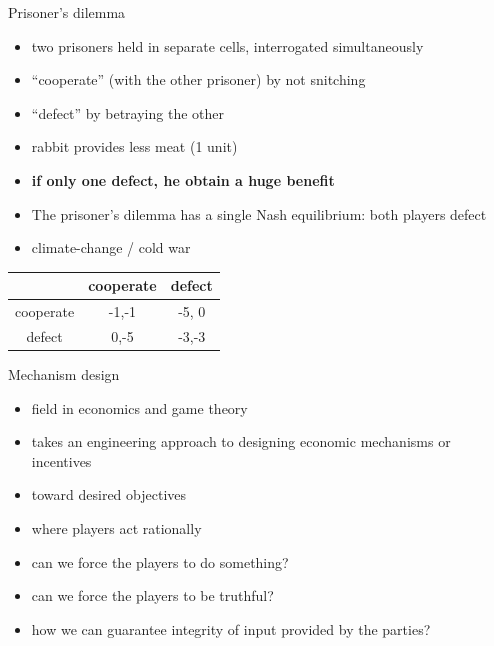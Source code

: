 \documentclass{beamer}
\begin{document}
\begin{frame}[t]{Prisoner's dilemma}
  \begin{itemize}
    \item two prisoners held in separate cells, interrogated simultaneously
    \item ``cooperate'' (with the other prisoner) by not snitching
    \item ``defect'' by betraying the other
    \item rabbit provides less meat (1 unit)
    \item<2-> \textbf{if only one defect, he obtain a huge benefit}
    \item<4->  The prisoner's dilemma has a single Nash equilibrium:
      both players defect
    \item<5->  climate-change / cold war
  \end{itemize}
   {
\begin{center}
  \begin{tabular}{|c|c|c|}
    \hline
              & cooperate & defect  \\
    \hline
cooperate     & -1,-1 & -5, 0 \\
    \hline
defect        & 0,-5 & -3,-3 \\
    \hline
  \end{tabular}
\end{center}
}
\end{frame}



\begin{frame}{Mechanism design}
  \begin{itemize}
    \item field in economics and game theory
    \item takes an engineering approach to designing economic
      mechanisms or incentives
    \item toward desired objectives
    \item where players act rationally
    \item can we force the players to do something?
    \item can we force the players to be truthful?
    \item how we can guarantee integrity of input provided by the parties?
  \end{itemize}
\end{frame}
\end{document}
